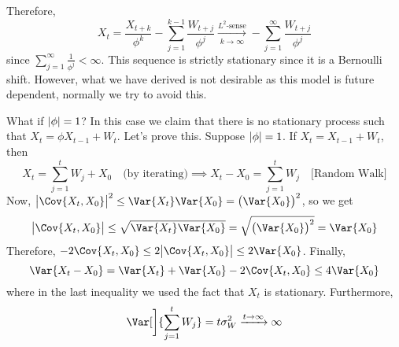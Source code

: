 Therefore,
\[ X_t=\frac{X_{t+k}}{\phi^k} -\sum_{j=1}^{k-1} \frac{W_{t+j}}{\phi^j}
    \xrightarrow[k\to\infty]{L^2\text{-sense}}-\sum_{j=1}^{\infty} \frac{W_{t+j}}{\phi^j}   \]
since $ \displaystyle \sum_{j=1}^{\infty} \frac{1}{\phi^j} <\infty $.
This sequence is strictly stationary since it is a Bernoulli shift.
However, what we have derived is not desirable as this model is
future dependent, normally we try to avoid this.

What if $ \lvert\phi\rvert=1 $? In this case we claim that
there is no stationary process such that $ X_t=\phi X_{t-1}+W_t $. Let's prove this.
Suppose $ \lvert\phi\rvert=1 $. If $ X_t=X_{t-1}+W_{t} $, then
\[ X_t=\sum_{j=1}^{t} W_j+X_0\quad\text{(by iterating)}
    \implies X_t-X_0=\sum_{j=1}^{t} W_j\quad\text{[Random Walk]} \]
Now, $ \abs[\big]{\Cov{X_t,X_0}}^2\le \Var{X_t}\Var{X_0}=\bigl(\Var{X_0}\bigr)^2 $,
so we get
\[ \abs[\big]{\Cov{X_t,X_0}}\le \sqrt{\Var{X_t}\Var{X_0}}=\sqrt{\bigl(\Var{X_0}\bigr)^2}=\Var{X_0} \]
Therefore, $ -2\Cov{X_t,X_0}\le 2\abs[\big]{\Cov{X_t,X_0}}\le 2\Var{X_0} $. Finally,
\[ \Var{X_t-X_0}=\Var{X_t}+\Var{X_0}-2\Cov{X_t,X_0}\le 4\Var{X_0} \]
where in the last inequality we used the fact that $ X_t $ is stationary.
Furthermore,
\[ \Var[\bigg]{\sum_{j=1}^{t} W_j}=t\sigma_W^2\xrightarrow{t\to\infty}\infty \]
